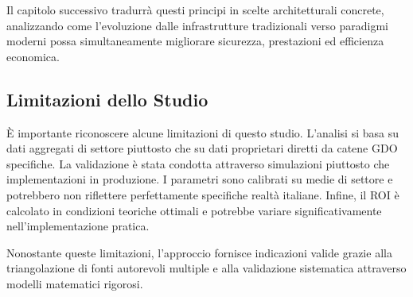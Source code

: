 Il capitolo successivo tradurrà questi principi in scelte architetturali concrete, analizzando come l'evoluzione dalle infrastrutture tradizionali verso paradigmi moderni possa simultaneamente migliorare sicurezza, prestazioni ed efficienza economica.

\subsection*{Limitazioni dello Studio}

È importante riconoscere alcune limitazioni di questo studio. L'analisi si basa su dati aggregati di settore piuttosto che su dati proprietari diretti da catene GDO specifiche. La validazione è stata condotta attraverso simulazioni piuttosto che implementazioni in produzione. I parametri sono calibrati su medie di settore e potrebbero non riflettere perfettamente specifiche realtà italiane. Infine, il ROI è calcolato in condizioni teoriche ottimali e potrebbe variare significativamente nell'implementazione pratica.

Nonostante queste limitazioni, l'approccio fornisce indicazioni valide grazie alla triangolazione di fonti autorevoli multiple e alla validazione sistematica attraverso modelli matematici rigorosi.

\clearpage
\printbibliography[
    heading=subbibliography,
    title={Riferimenti Bibliografici del Capitolo 2},
]